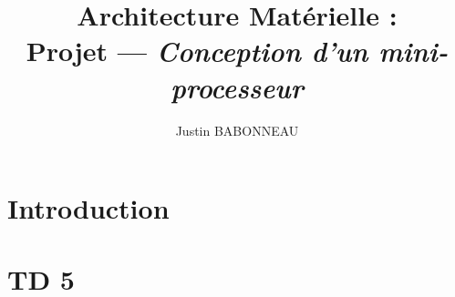 \documentclass[twoside, 12pt, a4paper]{article}
\begin{document}
\shorthandoff{:}

\newcommand{\tf}[4]{
\begin{figure}[!htb]
   \begin{minipage}{0.48\textwidth}
     \centering
     \texttt{[image: \#1]}
     \caption{#2}
   \end{minipage}\hfill
   \begin{minipage}{0.48\textwidth}
     \centering
     \texttt{[image: \#3]}
     \caption{#4}
   \end{minipage}
\end{figure}
}


\makeatletter

\renewcommand\subsubsection{\@startsection{subsubsection}{3}{\z@} {-3.25ex\@plus -1ex \@minus -.2ex}%
{1.5ex \@plus .2ex}%
{\color{gray}\normalfont\normalsize\fontsize{12}{17}\selectfont}}

\makeatother

\pagestyle{fancy}

\fancyhead{}\fancyfoot{}


\fancyfoot[C]{\thepage}

\title{Architecture Matérielle : \\ 
\textbf{Projet} --- \textit{Conception d'un mini-processeur}}

\author{Justin \textsc{BABONNEAU}}

\maketitle

\newpage

\section*{Introduction}

\newpage

\tableofcontents

\newpage

\section{TD 5}
\end{document}
